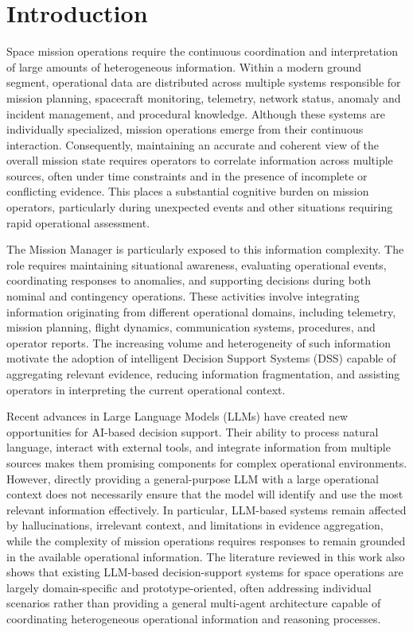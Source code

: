 
\chapter{Introduction}

Space mission operations require the continuous coordination and interpretation of large amounts of heterogeneous information. Within a modern ground segment, operational data are distributed across multiple systems responsible for mission planning, spacecraft monitoring, telemetry, network status, anomaly and incident management, and procedural knowledge. Although these systems are individually specialized, mission operations emerge from their continuous interaction. Consequently, maintaining an accurate and coherent view of the overall mission state requires operators to correlate information across multiple sources, often under time constraints and in the presence of incomplete or conflicting evidence. This places a substantial cognitive burden on mission operators, particularly during unexpected events and other situations requiring rapid operational assessment.

The Mission Manager is particularly exposed to this information complexity. The role requires maintaining situational awareness, evaluating operational events, coordinating responses to anomalies, and supporting decisions during both nominal and contingency operations. These activities involve integrating information originating from different operational domains, including telemetry, mission planning, flight dynamics, communication systems, procedures, and operator reports. The increasing volume and heterogeneity of such information motivate the adoption of intelligent Decision Support Systems (DSS) capable of aggregating relevant evidence, reducing information fragmentation, and assisting operators in interpreting the current operational context.

Recent advances in Large Language Models (LLMs) have created new opportunities for AI-based decision support. Their ability to process natural language, interact with external tools, and integrate information from multiple sources makes them promising components for complex operational environments. However, directly providing a general-purpose LLM with a large operational context does not necessarily ensure that the model will identify and use the most relevant information effectively. In particular, LLM-based systems remain affected by hallucinations, irrelevant context, and limitations in evidence aggregation, while the complexity of mission operations requires responses to remain grounded in the available operational information. The literature reviewed in this work also shows that existing LLM-based decision-support systems for space operations are largely domain-specific and prototype-oriented, often addressing individual scenarios rather than providing a general multi-agent architecture capable of coordinating heterogeneous operational information and reasoning processes.

